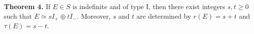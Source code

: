 \textbf{Theorem 4.} If $E \in S$ is indefinite and of type I, then there exist integers $s, t \geq 0$ such that $E \simeq s I_+ \oplus t I_-$. Moreover, $s$ and $t$ are determined by $r(E) = s + t$ and $\tau(E) = s - t$.

